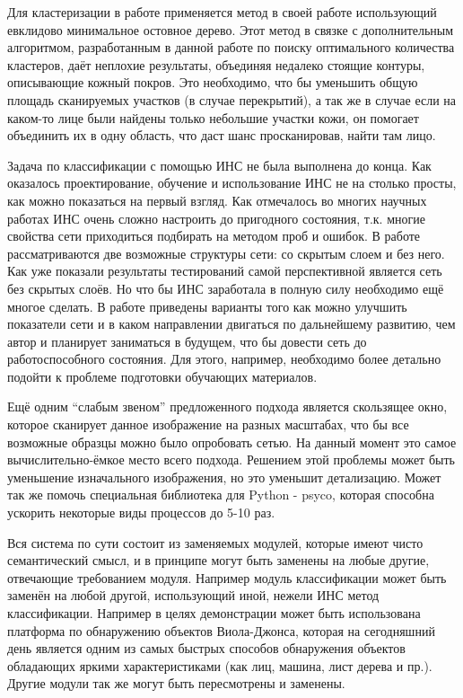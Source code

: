 \documentclass[12pt]{report}
\begin{document}
Для кластеризации в работе применяется метод в своей работе использующий евклидово минимальное остовное дерево. 
Этот метод в связке с дополнительным алгоритмом, разработанным в данной работе по поиску оптимального количества 
кластеров, даёт неплохие результаты, объединяя недалеко стоящие контуры, описывающие кожный покров. Это необходимо, 
что бы уменьшить общую площадь сканируемых участков (в случае перекрытий), а так же в случае если на каком-то лице 
были найдены только небольшие участки кожи, он помогает объединить их в одну область, что даст шанс просканировав, 
найти там лицо.

Задача по классификации с помощью ИНС не была выполнена до конца. Как оказалось проектирование, обучение и 
использование ИНС не на столько просты, как можно показаться на первый взгляд. Как отмечалось во многих научных 
работах ИНС очень сложно настроить до пригодного состояния, т.к. многие свойства сети приходиться подбирать на 
методом проб и ошибок. В работе рассматриваются две возможные структуры сети: со скрытым слоем и без него. Как уже 
показали результаты тестирований самой перспективной является сеть без скрытых слоёв. Но что бы ИНС заработала в 
полную силу необходимо ещё многое сделать. В работе приведены варианты того как можно улучшить показатели сети и в 
каком направлении двигаться по дальнейшему развитию, чем автор и планирует заниматься в будущем, что бы довести 
сеть до работоспособного состояния. Для этого, например, необходимо более детально подойти к проблеме подготовки 
обучающих материалов.

Ещё одним ``слабым звеном'' предложенного подхода является скользящее окно, которое сканирует данное изображение на 
разных масштабах, что бы все возможные образцы можно было опробовать сетью. На данный момент это самое 
вычислительно-ёмкое место всего подхода. Решением этой проблемы может быть уменьшение изначального изображения, но 
это уменьшит детализацию. Может так же помочь специальная библиотека для Python - psyco, которая способна ускорить 
некоторые виды процессов до 5-10 раз.

Вся система по сути состоит из заменяемых модулей, которые имеют чисто семантический смысл, и в принципе могут быть 
заменены на любые другие, отвечающие требованием модуля. Например модуль классификации может быть заменён на любой 
другой, использующий иной, нежели ИНС метод классификации. Например в целях демонстрации может быть использована 
платформа по обнаружению объектов Виола-Джонса, которая на сегодняшний день является одним из самых быстрых 
способов обнаружения объектов обладающих яркими характеристиками (как лиц, машина, лист дерева и пр.). Другие 
модули так же могут быть пересмотрены и заменены.
\end{document}
